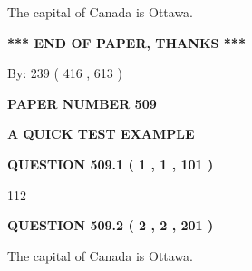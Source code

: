 \documentclass[12pt]{article}
\begin{document}
  
 
 
\noindent{}
 
 
The capital of Canada is Ottawa.
 
 
 
 
   
   
 \vspace{0.2in}
 
   
   
   
   
\vspace{1.0in} 
{\textbf{\large{ *** END OF PAPER, THANKS *** }}} 
   
   
\hspace{1.0in} By: 
 239 ( 416 ,  613 )
   
   
   
   
\newpage 
\setcounter{page}{ 
   509001 } 
   
   
   
   
 {\textbf{ \Large{ PAPER NUMBER  509  }}}
   
   
\vspace{0.2in}
   
   
   
   
   
   
 \vspace{0.2in}
{\LARGE {\textbf{ A QUICK TEST EXAMPLE}}}
   
   
  
\vspace{0.2in}
  
{\textbf{\Large{QUESTION
509.1 
 ( 1 , 1 , 101 )
}}}
  
  
 
 
\noindent{}

112
 
 
  
\vspace{0.2in}
  
{\textbf{\Large{QUESTION
509.2 
 ( 2 , 2 , 201 )
}}}
  
  
 
 
\noindent{}
 
 
The capital of Canada is Ottawa.
 
\end{document}
